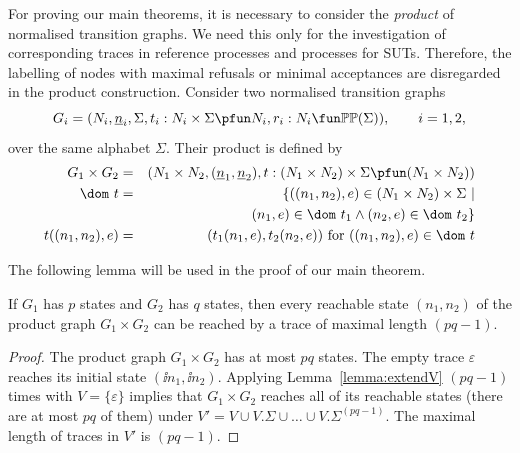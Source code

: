 For proving our main theorems, it is necessary to consider the \emph{product}
of normalised transition graphs. We need this only for the investigation of
corresponding traces in reference processes and processes for SUTs.
Therefore, the labelling of nodes with maximal refusals or minimal
acceptances are disregarded in the product construction. Consider two
normalised transition graphs
\[
G_i = ( N_i, \ii n_i, \Sigma, t_i : N_i\times\Sigma \pfun N_i, r_i : N_i \fun \mathbb{P}\mathbb{P}(\Sigma)),\qquad i = 1,2,
\]
over the same alphabet $\Sigma$. Their product is defined by
\begin{eqnarray}
G_1\times G_2 & = & (N_1\times N_2,(\ii n_1,\ii n_2), t:(N_1\times N_2)\times\Sigma\pfun (N_1\times N_2))
\\
\dom~t & = & \{ ((n_1,n_2),e)\in (N_1\times N_2)\times\Sigma~|   \nonumber
\\ & & \tabc
(n_1,e)\in\dom~t_1\wedge
(n_2,e) \in\dom~t_2    \}
\\
t((n_1,n_2),e) & = & (t_1(n_1,e),t_2(n_2,e))\ \text{for $((n_1,n_2),e)\in\dom~t$}
\end{eqnarray}

The following lemma will be used in the proof of our main theorem.
\begin{lemma}\label{lemma:reachproduc}
If $G_1$ has $p$ states and $G_2$ has $q$ states, then every reachable state
$(n_1,n_2)$ of the product graph $G_1\times G_2$ can be reached by a trace
of maximal length $(pq-1)$.
\end{lemma}
\begin{proof}
The product graph $G_1\times G_2$ has at most $pq$ states. The empty trace $\varepsilon$
reaches its initial state $(\ii n_1,\ii n_2)$. Applying Lemma~\ref{lemma:extendV}
$(pq-1)$ times with $V=\{\varepsilon \}$ implies that $G_1\times G_2$ reaches
all of its reachable states (there are at most $pq$ of them) under
$V' = V \cup V.\Sigma\cup\dots \cup V.\Sigma^{(pq-1)}$. The maximal length of traces in
$V'$ is $(pq-1)$.
\xbox
\end{proof}


%

